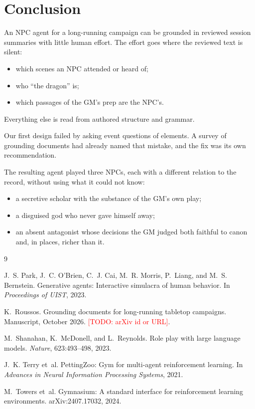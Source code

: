 \documentclass[11pt]{article}
\newcommand{\todo}[1]{\textcolor{red}{[TODO: #1]}}
\begin{document}
\section{Conclusion}
An NPC agent for a long-running campaign can be grounded in reviewed session summaries
with little human effort. The effort goes where the reviewed text is silent:
\begin{itemize}[nosep]
\item which scenes an NPC attended or heard of;
\item who ``the dragon'' is;
\item which passages of the GM's prep are the NPC's.
\end{itemize}
Everything else is read from authored structure and grammar.

Our first design failed by asking event questions of elements. A survey of grounding
documents had already named that mistake, and the fix was its own recommendation.

The resulting agent played three NPCs, each with a different relation to the record,
without using what it could not know:
\begin{itemize}[nosep]
\item a secretive scholar with the substance of the GM's own play;
\item a disguised god who never gave himself away;
\item an absent antagonist whose decisions the GM judged both faithful to canon and,
in places, richer than it.
\end{itemize}


\begin{thebibliography}{9}

J.~S. Park, J.~C. O'Brien, C.~J. Cai, M.~R. Morris, P.~Liang, and M.~S. Bernstein.
\newblock Generative agents: Interactive simulacra of human behavior.
\newblock In \emph{Proceedings of UIST}, 2023.

K.~Roussos.
\newblock Grounding documents for long-running tabletop campaigns.
\newblock Manuscript, October 2026. \todo{arXiv id or URL}.

M.~Shanahan, K.~McDonell, and L.~Reynolds.
\newblock Role play with large language models.
\newblock \emph{Nature}, 623:493--498, 2023.

J.~K. Terry et~al.
\newblock PettingZoo: Gym for multi-agent reinforcement learning.
\newblock In \emph{Advances in Neural Information Processing Systems}, 2021.

M.~Towers et~al.
\newblock Gymnasium: A standard interface for reinforcement learning environments.
\newblock arXiv:2407.17032, 2024.

\end{thebibliography}
\end{document}
